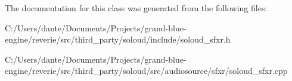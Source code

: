 The documentation for this class was generated from the following files\+:\begin{DoxyCompactItemize}
\item 
C\+:/\+Users/dante/\+Documents/\+Projects/grand-\/blue-\/engine/reverie/src/third\+\_\+party/soloud/include/soloud\+\_\+sfxr.\+h\item 
C\+:/\+Users/dante/\+Documents/\+Projects/grand-\/blue-\/engine/reverie/src/third\+\_\+party/soloud/src/audiosource/sfxr/soloud\+\_\+sfxr.\+cpp\end{DoxyCompactItemize}
